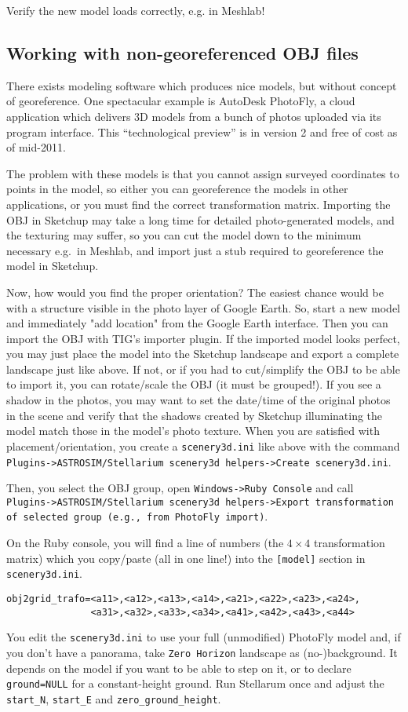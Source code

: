 \documentclass[a4paper]{article}
\newcommand{\filename}[1]{\texttt{#1}}
\newcommand{\cmd}[1]{\texttt{#1}}
\begin{document}
Verify the new model loads correctly, e.g. in Meshlab!

\subsection{Working with non-georeferenced OBJ files}
\label{sec:NonGeoreferenced}


There exists modeling software which produces nice models, but without
concept of georeference. One spectacular example is AutoDesk PhotoFly,
a cloud application which delivers 3D models from a bunch of photos
uploaded via its program interface. This ``technological preview'' is
in version 2 and free of cost as of mid-2011.

The problem with these models is that you cannot assign surveyed
coordinates to points in the model, so either you can georeference the
models in other applications, or you must find the correct
transformation matrix.  Importing the OBJ in Sketchup may take a long
time for detailed photo-generated models, and the texturing may
suffer, so you can cut the model down to the minimum necessary e.g.\ in
Meshlab, and import just a stub required to georeference the model in
Sketchup. 

Now, how would you find the proper orientation? The easiest chance
would be with a structure visible in the photo layer of Google
Earth. So, start a new model and immediately "add location" from the
Google Earth interface. Then you can import the OBJ with TIG's importer
plugin.  If the imported model looks perfect, you may just place the
model into the Sketchup landscape and export a complete landscape just
like above. If not, or if you had to cut/simplify the OBJ to be able
to import it, you can rotate/scale the OBJ (it must be grouped!). If
you see a shadow in the photos, you may want to set the date/time of
the original photos in the scene and verify that the shadows created by
Sketchup illuminating the model match those in the model's photo
texture. When you are satisfied with placement/orientation, you create
a \filename{scenery3d.ini} like above with the command
\cmd{Plugins->ASTROSIM/Stellarium scenery3d helpers->Create scenery3d.ini}.

Then, you select the OBJ group, open \cmd{Windows->Ruby Console} and call
\cmd{Plugins->ASTROSIM/Stellarium scenery3d helpers->Export transformation
of selected group (e.g., from PhotoFly import)}.

On the Ruby console, you will find a line of numbers (the $4\times4$
transformation matrix) which you copy/paste (all in one line!) into the
\filename{[model]} section in \filename{scenery3d.ini}.
\begin{verbatim}
obj2grid_trafo=<a11>,<a12>,<a13>,<a14>,<a21>,<a22>,<a23>,<a24>,
               <a31>,<a32>,<a33>,<a34>,<a41>,<a42>,<a43>,<a44>
\end{verbatim}
You edit the \filename{scenery3d.ini} to use your full (unmodified)
PhotoFly model and, if you don't have a panorama, take \filename{Zero Horizon}
landscape as (no-)background. It depends on the model if you want to
be able to step on it, or to declare \verb|ground=NULL| for a
constant-height ground. Run Stellarum once and adjust the
\verb|start_N|, \verb|start_E| and \verb|zero_ground_height|.
\end{document}

